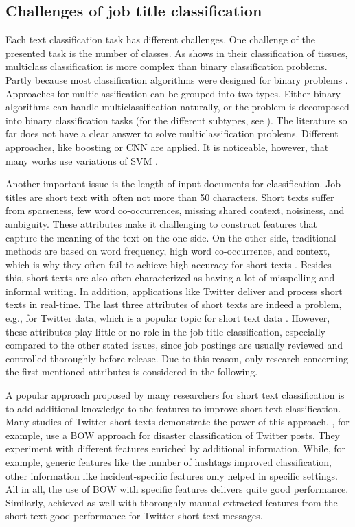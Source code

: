 \documentclass[12pt, a4paper, titlepage]{article}
\begin{document}
\subsection*{Challenges of job title classification}
Each text classification task has different challenges. One challenge of the presented task is the number of classes. As \cite{Li2004} shows in their classification of tissues, multiclass classification is more complex than binary classification problems. Partly because most classification algorithms were designed for binary problems \citep{Aly2005}. Approaches for multiclassification can be grouped into two types. Either binary algorithms can handle multiclassification naturally, or the problem is decomposed into binary classification tasks (for the different subtypes, see \cite{Aly2005}). The literature so far does not have a clear answer to solve multiclassification problems. Different approaches, like boosting \citep{Schapire2000} or \ac{CNN} \citep{Farooq2017} are applied. It is noticeable, however, that many works use variations of SVM \citep{Guo2015, Tomar2015, Tang2019}.  

Another important issue is the length of input documents for classification. Job titles are short text with often not more than 50 characters. Short texts suffer from sparseness, few word co-occurrences, missing shared context, noisiness, and ambiguity. These attributes make it challenging to construct features that capture the meaning of the text on the one side. On the other side, traditional methods are based on word frequency, high word co-occurrence, and context, which is why they often fail to achieve high accuracy for short texts \citep{Song2014, WangY2017, WangF2014,  alsmadi2019}. Besides this, short texts are also often characterized as having a lot of misspelling and informal writing. In addition, applications like Twitter deliver and process short texts in real-time. The last three attributes of short texts are indeed a problem, e.g., for Twitter data, which is a popular topic for short text data \citep{karimi2013, sriram2010, yan2018}. However, these attributes play little or no role in the job title classification, especially compared to the other stated issues, since job postings are usually reviewed and controlled thoroughly before release. Due to this reason, only research concerning the first mentioned attributes is considered in the following. 

A popular approach proposed by many researchers for short text classification is to add additional knowledge to the features to improve short text classification. Many studies of Twitter short texts demonstrate the power of this approach. \citet{karimi2013}, for example, use a \ac{BOW} approach for disaster classification of Twitter posts. They experiment with different features enriched by additional information. While, for example, generic features like the number of hashtags improved classification, other information like incident-specific features only helped in specific settings. All in all, the use of \ac{BOW} with specific features delivers quite good performance. Similarly, \citet{sriram2010} achieved as well with thoroughly manual extracted features from the short text good performance for Twitter short text messages. 
\end{document}
